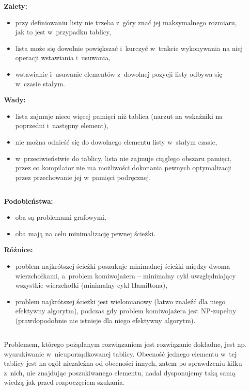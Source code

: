 \bigskip
\noindent\textbf{Zalety:}
\begin{itemize}
	\item przy definiowaniu listy nie trzeba z~góry znać jej maksymalnego rozmiaru, jak to jest w~przypadku tablicy,
	\item lista może się dowolnie powiększać i~kurczyć w~trakcie wykonywania na niej operacji wstawiania i~usuwania,
	\item wstawianie i~usuwanie elementów z~dowolnej pozycji listy odbywa się w~czasie stałym.
\end{itemize}
\textbf{Wady:}
\begin{itemize}
	\item lista zajmuje nieco więcej pamięci niż tablica (narzut na wskaźniki na poprzedni i~następny element),
	\item nie można odnieść się do dowolnego elementu listy w~stałym czasie,
	\item w~przeciwieństwie do tablicy, lista nie zajmuje ciągłego obszaru pamięci, przez co kompilator nie ma możliwości dokonania pewnych optymalizacji przez przechowanie jej w~pamięci podręcznej.
\end{itemize}

\subsection{} %
\noindent\textbf{Podobieństwa:}
\begin{itemize}
	\item oba są problemami grafowymi,
	\item oba mają na celu minimalizację pewnej ścieżki.
\end{itemize}
\textbf{Różnice:}
\begin{itemize}
	\item problem najkrótszej ścieżki poszukuje minimalnej ścieżki między dwoma wierzchołkami, a~problem komiwojażera -- minimalny cykl uwzględniający wszystkie wierzchołki (minimalny cykl Hamiltona),
	\item problem najkrótszej ścieżki jest wielomianowy (łatwo znaleźć dla niego efektywny algorytm), podczas gdy problem komiwojażera jest \mbox{NP-zupełny} (prawdopodobnie nie istnieje dla niego efektywny algorytm).
\end{itemize}

\subsection{} %
Problemem, którego pożądanym rozwiązaniem jest rozwiązanie dokładne, jest np. wyszukiwanie w~nieuporządkowanej tablicy. Obecność jednego elementu w~tej tablicy jest na ogół niezależna od obecności innych, zatem po sprawdzeniu kilku z~nich, nie znajdując poszukiwanego elementu, nadal dysponujemy taką samą wiedzą jak przed rozpoczęciem szukania.

